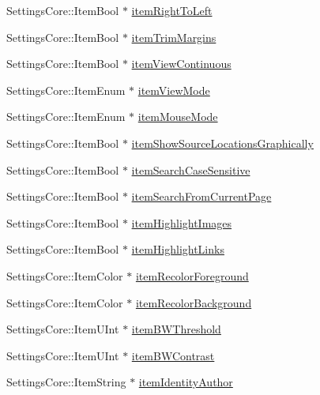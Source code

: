 \begin{DoxyCompactItemize}
\item 
Settings\+Core\+::\+Item\+Bool $\ast$ \hyperlink{classOkular_1_1SettingsPrivate_ae1b0d4803230e42e6ff4a4266181bd3f}{item\+Right\+To\+Left}
\item 
Settings\+Core\+::\+Item\+Bool $\ast$ \hyperlink{classOkular_1_1SettingsPrivate_a980c4854d0545775b05ba317138a25d2}{item\+Trim\+Margins}
\item 
Settings\+Core\+::\+Item\+Bool $\ast$ \hyperlink{classOkular_1_1SettingsPrivate_a819238b76819053c13a29191b8766e21}{item\+View\+Continuous}
\item 
Settings\+Core\+::\+Item\+Enum $\ast$ \hyperlink{classOkular_1_1SettingsPrivate_a8a95244330e62699e739be887460a2ba}{item\+View\+Mode}
\item 
Settings\+Core\+::\+Item\+Enum $\ast$ \hyperlink{classOkular_1_1SettingsPrivate_ae13f858f8dd1e530090ff4f063632dcd}{item\+Mouse\+Mode}
\item 
Settings\+Core\+::\+Item\+Bool $\ast$ \hyperlink{classOkular_1_1SettingsPrivate_a52a3dd610296e632468dd63ed3d165fe}{item\+Show\+Source\+Locations\+Graphically}
\item 
Settings\+Core\+::\+Item\+Bool $\ast$ \hyperlink{classOkular_1_1SettingsPrivate_aadab39c61d1860215823fbc1ce76e3b0}{item\+Search\+Case\+Sensitive}
\item 
Settings\+Core\+::\+Item\+Bool $\ast$ \hyperlink{classOkular_1_1SettingsPrivate_aa251d7a638d4cd802c4f69c8e70a3bd4}{item\+Search\+From\+Current\+Page}
\item 
Settings\+Core\+::\+Item\+Bool $\ast$ \hyperlink{classOkular_1_1SettingsPrivate_af3f1a9c4948bb1310b04cb379202d332}{item\+Highlight\+Images}
\item 
Settings\+Core\+::\+Item\+Bool $\ast$ \hyperlink{classOkular_1_1SettingsPrivate_a8591ce945239814a8fa2059d6745285d}{item\+Highlight\+Links}
\item 
Settings\+Core\+::\+Item\+Color $\ast$ \hyperlink{classOkular_1_1SettingsPrivate_a31381738b83f17a0f015465f4757b892}{item\+Recolor\+Foreground}
\item 
Settings\+Core\+::\+Item\+Color $\ast$ \hyperlink{classOkular_1_1SettingsPrivate_a50f9f6fcd91ced5f63d0790d0a8e62df}{item\+Recolor\+Background}
\item 
Settings\+Core\+::\+Item\+U\+Int $\ast$ \hyperlink{classOkular_1_1SettingsPrivate_ad54cedc7f9a8f1fcf4bac28c00af0e0f}{item\+B\+W\+Threshold}
\item 
Settings\+Core\+::\+Item\+U\+Int $\ast$ \hyperlink{classOkular_1_1SettingsPrivate_ab07751ab5f10de8ca8f842447a45a2cd}{item\+B\+W\+Contrast}
\item 
Settings\+Core\+::\+Item\+String $\ast$ \hyperlink{classOkular_1_1SettingsPrivate_a3e96a0f77a09d9d3b33cea85c9d78087}{item\+Identity\+Author}
\end{DoxyCompactItemize}


